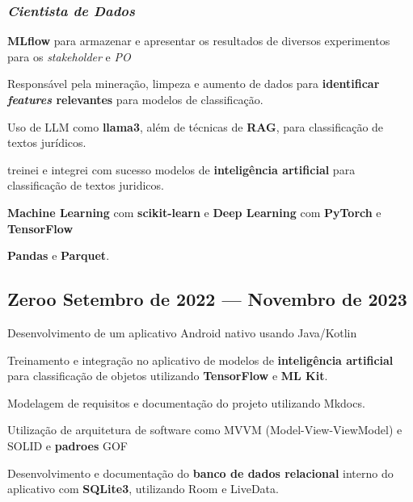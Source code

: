\documentclass[a4paper,12pt]{article}
\begin{document}
\subsubsection*{\normalsize \textit{Cientista de Dados}}
\vspace{-1em}
\vspace{-0.5em}
\begin{zitemize}
    \item \textbf{MLflow} para armazenar e apresentar os resultados de diversos experimentos para os \textit{stakeholder} e \textit{PO}
    \item Responsável pela mineração, limpeza e aumento de dados para \textbf{identificar \textit{features} relevantes} para modelos de classificação.
    \item Uso de LLM como \textbf{llama3}, além de técnicas de \textbf{RAG}, para classificação de textos jurídicos.
    \item treinei e integrei com sucesso modelos de \textbf{inteligência artificial} para classificação de textos juridicos.
    \item \textbf{Machine Learning} com \textbf{ scikit-learn} e \textbf{Deep Learning} com \textbf{PyTorch} e  \textbf{TensorFlow}
    \item \textbf{Pandas} e \textbf{Parquet}.
\end{zitemize}

\vspace{1.5em}
\vspace*{7pt}
\vspace{1.5em}

\subsection*{\large Zeroo \hfill Setembro de 2022 --- Novembro de 2023}

\vspace{-0.5em}
\begin{zitemize}
    \item Desenvolvimento de um aplicativo Android nativo usando Java/Kotlin
    \item Treinamento e integração no aplicativo de modelos de \textbf{inteligência artificial} para classificação de objetos utilizando \textbf{TensorFlow} e \textbf{ML Kit}.  
    \item Modelagem de requisitos e documentação do projeto utilizando Mkdocs.
    \item Utilização de arquitetura de software como MVVM (Model-View-ViewModel) e SOLID e \textbf{padroes} GOF
    \item Desenvolvimento e documentação do \textbf{banco de dados relacional} interno do aplicativo com \textbf{SQLite3}, utilizando Room e LiveData.
\end{zitemize}
\end{document}
